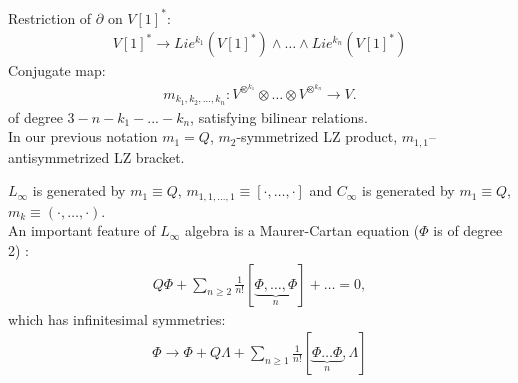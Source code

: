 \documentclass[9pt]{beamer}
\newcommand{\p}{\partial}
\begin{document}
\begin{frame}[t]
Restriction of $\p$ on $V[1]^{*}$:
\begin{eqnarray*}
V[1]^{*}\to Lie^{k_1}(V[1]^{*})\wedge\dots\wedge Lie^{k_n}(V[1]^{*})
\end{eqnarray*}
Conjugate map:
\begin{eqnarray*}
m_{k_1,k_2, \dots ,k_n}:  V^{\otimes^{k_1}}\otimes \dots \otimes V^{\otimes^{k_n}}\to V.
\end{eqnarray*}
of degree $3-n-k_1-...-k_n$, satisfying bilinear relations. \\
\vspace*{3mm} 
In our previous notation $m_1=Q$, $m_{2}$-symmetrized LZ product, $m_{1,1}$--antisymmetrized LZ bracket.\\

\vspace*{3mm}

$L_{\infty}$ is generated 
by $m_1\equiv Q$, $m_{1,1,...,1}\equiv [\cdot ,\dots, \cdot ]$ and $C_{\infty}$ is generated by $m_1\equiv Q$, $m_k\equiv (\cdot, \dots, \cdot)$. \\
\vspace*{2mm} 
An important feature of 
$L_{\infty}$ algebra is a Maurer-Cartan equation ($\Phi$ is of degree 2) :
\begin{eqnarray*}
Q\Phi+\sum_{n\ge 2}\frac{1}{n!}[\underbrace{\Phi,\dots, \Phi}_{n}]+\dots=0,
\end{eqnarray*}
which has infinitesimal symmetries:
\begin{eqnarray*}
\Phi\to \Phi+Q\Lambda+\sum_{n\ge 1}\frac{1}{n!}[\underbrace{\Phi\dots\Phi}_{n}, \Lambda] 
\end{eqnarray*}


\end{frame}
\end{document}
